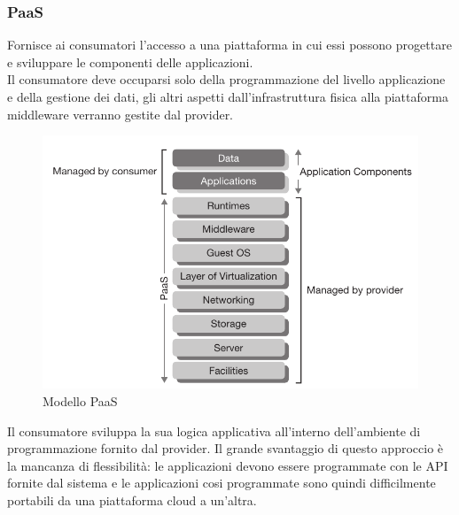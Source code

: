 \documentclass{article}
\begin{document}
\subsubsection{PaaS}
Fornisce ai consumatori l’accesso a una piattaforma in cui essi possono progettare e sviluppare le componenti delle applicazioni.\\
Il consumatore deve occuparsi solo della programmazione del livello applicazione e della gestione dei dati, gli altri aspetti dall’infrastruttura fisica alla piattaforma middleware verranno gestite dal provider.
\begin{figure}[H]
    \centering
    \includegraphics[scale=0.5]{img/paas.png}
    \caption{Modello PaaS}
\end{figure}
\noindent
Il consumatore sviluppa la sua logica applicativa all’interno dell’ambiente di programmazione fornito dal provider. Il grande svantaggio di questo approccio è la mancanza di flessibilità: le applicazioni devono essere programmate con le API fornite dal sistema e le applicazioni cosi programmate sono quindi difficilmente portabili da una piattaforma cloud a un’altra.
\end{document}
